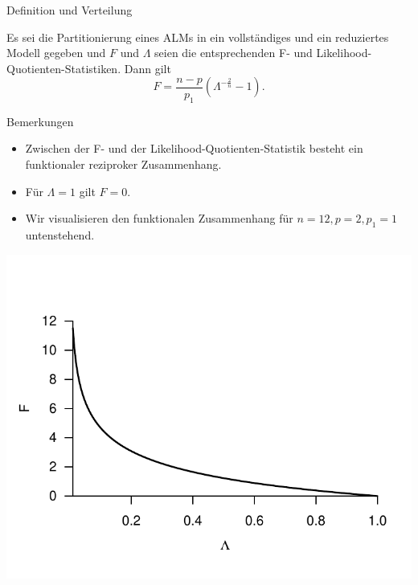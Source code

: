 \documentclass[
  8pt,
  ignorenonframetext,
]{beamer}
\providecommand{\tightlist}{%
  \setlength{\itemsep}{0pt}\setlength{\parskip}{0pt}}
\begin{document}
\begin{frame}{Definition und Verteilung}
\protect\hypertarget{definition-und-verteilung-2}{}
\vspace{2mm}
\footnotesize
\begin{theorem}
\justifying
\normalfont
Es sei die Partitionierung eines ALMs in ein vollständiges und ein reduziertes Modell
gegeben und $F$ und $\Lambda$ seien die entsprechenden F- und Likelihood-Quotienten-Statistiken. 
Dann gilt
\begin{equation}
F = \frac{n-p}{p_1}\left(\Lambda^{-\frac{2}{n}} -1 \right).
\end{equation}
\end{theorem}
\vspace{-2mm}

Bemerkungen

\begin{itemize}
\tightlist
\item
  Zwischen der F- und der Likelihood-Quotienten-Statistik besteht ein
  funktionaler reziproker Zusammenhang.
\item
  Für \(\Lambda = 1\) gilt \(F = 0\).
\item
  Wir visualisieren den funktionalen Zusammenhang für
  \(n = 12, p = 2, p_1 = 1\) untenstehend.
\end{itemize}

\vspace{-2mm}

\begin{center}\includegraphics[width=0.5\linewidth]{8_Abbildungen/alm_8_F_Lambda} \end{center}
\end{frame}
\end{document}
